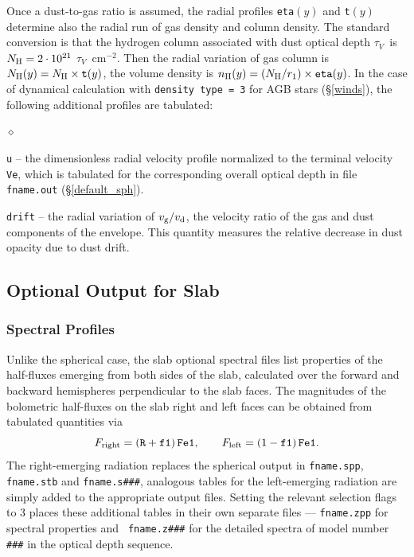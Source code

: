 \documentclass[11pt]{article}
\def\E#1{\hbox{$10^{#1}$}}
\def\tV     {\hbox{$\tau_V$}}
\begin{document}
Once a dust-to-gas ratio is assumed, the radial profiles {\tt eta}$(y)$ and
{\tt t}$(y)$ determine also the radial run of gas density and column density.
The standard conversion is that the hydrogen column associated with dust
optical depth \tV\ is $N_{\rm H} = 2\cdot\E{21}$ \tV\ cm$^{-2}$. Then the
radial variation of gas column is $N_{\rm H}(y) = N_{\rm H}\times{\tt t}(y)$,
the volume density is $n_{\rm H}(y) = (N_{\rm H}/r_1)\times{\tt eta}(y)$. In
the case of dynamical calculation with {\tt density type = 3} for AGB stars
(\S\ref{winds}), the following additional profiles are tabulated:

\begin{list}{$\diamond$}{}
\item {\tt u} -- the dimensionless radial velocity profile normalized to the
    terminal velocity {\tt Ve}, which is tabulated for the corresponding
    overall optical depth in file {\tt fname.out} (\S \ref{default_sph}).
\item {\tt drift} -- the radial variation of $v_{\rm g}/v_{\rm d}$, the
    velocity ratio of the gas and dust components of the envelope.  This
    quantity measures the relative decrease in dust opacity due to dust drift.

\end{list}

\subsection{Optional Output for Slab}
\label{OptionalOutput_slb}

\subsubsection{Spectral Profiles}
Unlike the spherical case, the slab optional spectral files list properties of
the half-fluxes emerging from both sides of the slab, calculated over the
forward and backward hemispheres perpendicular to the slab faces.  The
magnitudes of the bolometric half-fluxes on the slab right and left faces can
be obtained from tabulated quantities via
 $$ F_{\rm right} = ({\tt R} + {\tt f1})\,{\tt Fe1}, \qquad
    F_{\rm left}  = (1 - {\tt f1})\,{\tt Fe1}. $$
The right-emerging radiation replaces the spherical output in {\tt fname.spp},
{\tt fname.stb} and {\tt fname.s\#\#\#}, analogous tables for the left-emerging
radiation are simply added to the appropriate output files. Setting the
relevant selection flags to 3 places these additional tables in their own
separate files --- {\tt fname.zpp} for spectral properties and {\tt
fname.z\#\#\#} for the detailed spectra of model number {\tt \#\#\#} in the
optical depth sequence.
\end{document}
